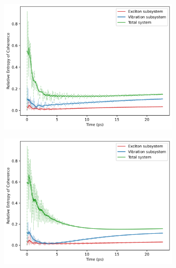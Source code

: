 \documentclass[11pt]{article}
\begin{document}
\begin{figure}[H]
    \centering
    \begin{subfigure}{0.45\textwidth}
        \centering
        \includegraphics[width=\linewidth]{Research Project/Code/results/ExVib/Open/Coherence/coh_spont_e0.png}
        \caption{}
        \label{fig:EVM_OQS_Coh_spont}
    \end{subfigure}
    \hfill
    \begin{subfigure}{0.45\textwidth}
        \centering
        \includegraphics[width=\linewidth]{Research Project/Code/results/ExVib/Open/Coherence/coh_therm_e0.png}
        \caption{}
        \label{fig:EVM_OQS_Coh_therm}
    \end{subfigure}
    

\end{figure}
\end{document}
